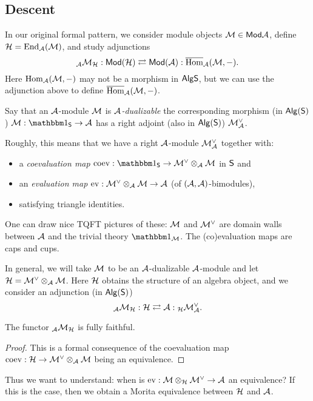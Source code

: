 \documentclass{article}
\begin{document}
\subsection{Descent}

In our original formal pattern, we consider module objects $\mathcal{M} \in \mathsf{Mod} \mathcal{A}$, define $\mathcal{H} = \operatorname{End}_{\mathcal{A}}(\mathcal{M})$, and study adjunctions
\[
	{}_{\mathcal{A}} \mathcal{M}_{\mathcal{H}}: \mathsf{Mod}(\mathcal{H}) \rightleftarrows \mathsf{Mod}(\mathcal{A}) : \overline{\operatorname{Hom}}_{\mathcal{A}}(\mathcal{M}, -).
\]
Here $\operatorname{Hom}_{\mathcal{A}}(\mathcal{M}, -)$ may not be a morphism in $\mathsf{Alg} \mathsf{S}$, but we can use the adjunction above to define $\overline{\operatorname{Hom}}_{\mathcal{A}}(\mathcal{M}, -)$.

\begin{dfn}
	Say that an $\mathcal{A}$-module $\mathcal{M}$ is \emph{$\mathcal{A}$-dualizable} the corresponding morphism (in $\mathsf{Alg}(\mathsf{S})$) $\Mc: \onebb_\Ssf \to \Ac$ has a right adjoint (also in $\mathsf{Alg}(\mathsf{S})$) $\mathcal{M}_{\mathcal{A}}^\vee$.
\end{dfn}

Roughly, this means that we have a right $\mathcal{A}$-module $\mathcal{M}^\vee_{\mathcal{A}}$ together with:
\begin{itemize}
	\item a \emph{coevaluation map} $\coev: \onebb_\Ssf \to \Mc^\vee \otimes_\Ac \Mc$ in $\mathsf{S}$ and
	\item an \emph{evaluation map} $\operatorname{ev}: \mathcal{M}^\vee \otimes_{\mathcal{A}} \mathcal{M} \to \mathcal{A}$ (of $(\mathcal{A}, \mathcal{A})$-bimodules),
	\item satisfying triangle identities.
\end{itemize}
One can draw nice TQFT pictures of these: $\mathcal{M}$ and $\mathcal{M}^\vee$ are domain walls between $\mathcal{A}$ and the trivial theory $\onebb_\Mc$.
The (co)evaluation maps are caps and cups.

In general, we will take $\mathcal{M}$ to be an $\mathcal{A}$-dualizable $\mathcal{A}$-module and let $\mathcal{H} = \mathcal{M}^\vee \otimes_{\mathcal{A}} \mathcal{M}$.
Here $\mathcal{H}$ obtains the structure of an algebra object, and we consider an adjunction (in $\mathsf{Alg}(\mathsf{S})$)
\[
	{}_{\mathcal{A}} \mathcal{M}_{\mathcal{H}}: \mathcal{H} \rightleftarrows \mathcal{A} : {}_{\mathcal{H}} \mathcal{M}^\vee_{\mathcal{A}}.
\]

\begin{prop}
	The functor ${}_{\mathcal{A}} \mathcal{M}_{\mathcal{H}}$ is fully faithful.
\end{prop}

\begin{proof}
	This is a formal consequence of the coevaluation map $\operatorname{coev}: \mathcal{H} \to \mathcal{M}^\vee \otimes_{\mathcal{A}} \mathcal{M}$ being an equivalence.
\end{proof}

Thus we want to understand: when is $\operatorname{ev}: \mathcal{M} \otimes_{\mathcal{H}} \mathcal{M}^\vee \to \mathcal{A}$ an equivalence?
If this is the case, then we obtain a Morita equivalence between $\mathcal{H}$ and $\mathcal{A}$.
\end{document}
